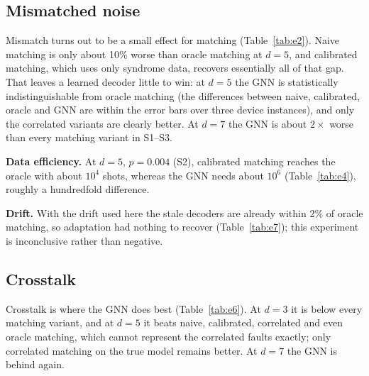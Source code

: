 \documentclass[11pt]{article}
\begin{document}
\subsection{Mismatched noise}
\begin{table}[t]
\centering\small

\caption{S2 (heterogeneous rates plus bad couplers), $p=0.004$: per-round logical error rate, mean over three device instances.}
\label{tab:e2}
\end{table}
Mismatch turns out to be a small effect for matching (Table~\ref{tab:e2}). Naive matching is only about 10\% worse than oracle matching at $d=5$, and calibrated matching, which uses only syndrome data, recovers essentially all of that gap. That leaves a learned decoder little to win: at $d=5$ the GNN is statistically indistinguishable from oracle matching (the differences between naive, calibrated, oracle and GNN are within the error bars over three device instances), and only the correlated variants are clearly better. At $d=7$ the GNN is about $2\times$ worse than every matching variant in S1--S3.

\textbf{Data efficiency.} At $d=5$, $p=0.004$ (S2), calibrated matching reaches the oracle with about $10^4$ shots, whereas the GNN needs about $10^6$ (Table~\ref{tab:e4}), roughly a hundredfold difference.
\begin{table}[t]
\centering\small

\caption{Data efficiency (S2, $d=5$, $p=0.004$): calibration shots for matching and unique training shots for the GNN, per-round logical error rate; oracle matching $6.29\times10^{-3}$, naive matching $6.95\times10^{-3}$.}
\label{tab:e4}
\end{table}
\begin{table}[t]
\centering\small

\caption{Adapting to drift with few new shots (S3, $d=5$, $p=0.004$): per-round logical error rate. The drift was too weak to matter, so this test is inconclusive.}
\label{tab:e7}
\end{table}
\textbf{Drift.} With the drift used here the stale decoders are already within 2\% of oracle matching, so adaptation had nothing to recover (Table~\ref{tab:e7}); this experiment is inconclusive rather than negative.

\subsection{Crosstalk}
\begin{table}[t]
\centering\small

\caption{S4 (crosstalk), $p=0.0025$: per-round logical error rate. ``n/a'': correlated matching on the true model cannot be built with correct logical labels at $d=3$ (see text).}
\label{tab:e6}
\end{table}
Crosstalk is where the GNN does best (Table~\ref{tab:e6}). At $d=3$ it is below every matching variant, and at $d=5$ it beats naive, calibrated, correlated and even oracle matching, which cannot represent the correlated faults exactly; only correlated matching on the true model remains better. At $d=7$ the GNN is behind again.
\end{document}
